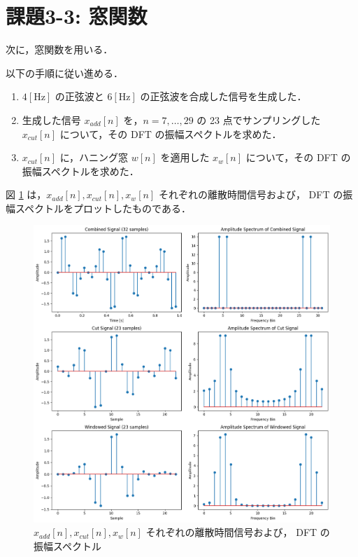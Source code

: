\documentclass[fleqn, a4paper. 12pt]{jsarticle}
\begin{document}
    \section*{課題3-3: 窓関数}

    次に，窓関数を用いる．

    以下の手順に従い進める．

    \begin{enumerate}
      \item $4 [\mathrm{Hz}]$ の正弦波と $6 [\mathrm{Hz}]$ の正弦波を合成した信号を生成した．
      \item 生成した信号 $x_{add}[n]$ を，$n = 7, \dots, 29$ の 23 点でサンプリングした $x_{cut}[n]$ について，その DFT の振幅スペクトルを求めた．
      \item $x_{cut}[n]$ に，ハニング窓 $w[n]$ を適用した $x_w[n]$ について，その DFT の振幅スペクトルを求めた．
    \end{enumerate}

    図 \ref{fig:fig11} は，$x_{add}[n], x_{cut}[n], x_w[n]$ それぞれの離散時間信号および， DFT の振幅スペクトルをプロットしたものである．
  
    \begin{figure}[!h]
      \centering
      \includegraphics[width=1\textwidth]{fig_3_3.png}
      \caption{$x_{add}[n], x_{cut}[n], x_w[n]$ それぞれの離散時間信号および， DFT の振幅スペクトル}
      \label{fig:fig11}
    \end{figure}
  
\end{document}
